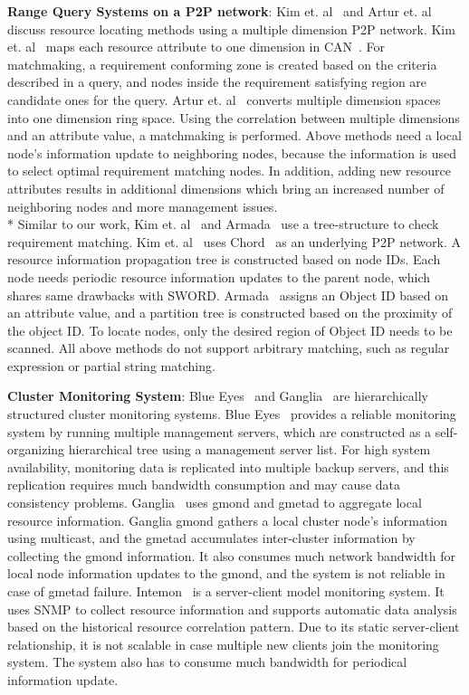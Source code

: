 \documentclass{acm_proc_article-sp}
\begin{document}
\textbf{Range Query Systems on a P2P network}: Kim et. al~\cite{can_query} and Artur et. al~\cite{query_for_grid} discuss resource locating methods using a multiple dimension P2P network. 
Kim et. al~\cite{can_query} maps each resource attribute to one dimension in CAN~\cite{can}. For matchmaking, a requirement conforming zone is created based on the criteria described in a query, 
and nodes inside the requirement satisfying region are candidate ones for the query.
Artur et. al~\cite{query_for_grid} converts multiple dimension spaces into one dimension ring space. Using the correlation between multiple dimensions and an attribute value, a matchmaking is performed. 
Above methods need a local node's information update to neighboring nodes, because the information is used to select optimal requirement matching nodes.  
In addition, adding new resource attributes results in additional dimensions which bring an increased number of neighboring nodes and more management issues.\\*
Similar to our work, Kim et. al~\cite{chord_matching} and Armada~\cite{armada} use a tree-structure to check requirement matching. 
Kim et. al~\cite{chord_matching} uses Chord~\cite{chord} as an underlying P2P network. A resource information propagation tree is
constructed based on node IDs. Each node needs periodic resource information updates to the parent node, which shares same drawbacks with SWORD.
Armada~\cite{armada} assigns an Object ID based on an attribute value, and a partition tree is constructed based on the proximity of the object ID. 
To locate nodes, only the desired region of Object ID needs to be scanned. All above methods do not support arbitrary matching, such as regular expression or partial string matching.

\textbf{Cluster Monitoring System}: Blue Eyes~\cite{blueeyes} and Ganglia~\cite{ganglia} are hierarchically structured cluster monitoring systems. 
Blue Eyes~\cite{blueeyes} provides a reliable monitoring system by running multiple management servers, which are constructed as a self-organizing hierarchical tree using a management server list. 
For high system availability, monitoring data is replicated into multiple backup servers, and this replication requires much bandwidth consumption and may cause data consistency problems.
Ganglia~\cite{ganglia} uses gmond and gmetad to aggregate local resource information. 
Ganglia gmond gathers a local cluster node's information using multicast, and the gmetad accumulates inter-cluster information by collecting the gmond information.
It also consumes much network bandwidth for local node information updates to the gmond, and the system is not reliable in case of gmetad failure.
Intemon~\cite{intemon} is a server-client model monitoring system. It uses SNMP to collect resource information and supports automatic data analysis based on the historical resource correlation pattern.
Due to its static server-client relationship, it is not scalable in case multiple new clients join the monitoring system. The system also has to consume much bandwidth for periodical information update.
\end{document}
